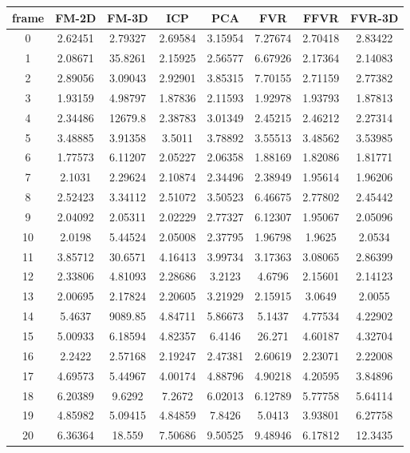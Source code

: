 \begin{figure}
\centering
\begin{tabular}{cccccccc}
\hline
\textbf{frame} & \textbf{FM-2D} & \textbf{FM-3D} & \textbf{ICP} & \textbf{PCA} & \textbf{FVR} & \textbf{FFVR} & \textbf{FVR-3D}
\\ \hline
0 & 2.62451 & 2.79327 & 2.69584 & 3.15954 & 7.27674 & 2.70418 & 2.83422\\
1 & 2.08671 & 35.8261 & 2.15925 & 2.56577 & 6.67926 & 2.17364 & 2.14083\\
2 & 2.89056 & 3.09043 & 2.92901 & 3.85315 & 7.70155 & 2.71159 & 2.77382\\
3 & 1.93159 & 4.98797 & 1.87836 & 2.11593 & 1.92978 & 1.93793 & 1.87813\\
4 & 2.34486 & 12679.8 & 2.38783 & 3.01349 & 2.45215 & 2.46212 & 2.27314\\
5 & 3.48885 & 3.91358 & 3.5011 & 3.78892 & 3.55513 & 3.48562 & 3.53985\\
6 & 1.77573 & 6.11207 & 2.05227 & 2.06358 & 1.88169 & 1.82086 & 1.81771\\
7 & 2.1031 & 2.29624 & 2.10874 & 2.34496 & 2.38949 & 1.95614 & 1.96206\\
8 & 2.52423 & 3.34112 & 2.51072 & 3.50523 & 6.46675 & 2.77802 & 2.45442\\
9 & 2.04092 & 2.05311 & 2.02229 & 2.77327 & 6.12307 & 1.95067 & 2.05096\\
10 & 2.0198 & 5.44524 & 2.05008 & 2.37795 & 1.96798 & 1.9625 & 2.0534\\
11 & 3.85712 & 30.6571 & 4.16413 & 3.99734 & 3.17363 & 3.08065 & 2.86399\\
12 & 2.33806 & 4.81093 & 2.28686 & 3.2123 & 4.6796 & 2.15601 & 2.14123\\
13 & 2.00695 & 2.17824 & 2.20605 & 3.21929 & 2.15915 & 3.0649 & 2.0055\\
14 & 5.4637 & 9089.85 & 4.84711 & 5.86673 & 5.1437 & 4.77534 & 4.22902\\
15 & 5.00933 & 6.18594 & 4.82357 & 6.4146 & 26.271 & 4.60187 & 4.32704\\
16 & 2.2422 & 2.57168 & 2.19247 & 2.47381 & 2.60619 & 2.23071 & 2.22008\\
17 & 4.69573 & 5.44967 & 4.00174 & 4.88796 & 4.90218 & 4.20595 & 3.84896\\
18 & 6.20389 & 9.6292 & 7.2672 & 6.02013 & 6.12789 & 5.77758 & 5.64114\\
19 & 4.85982 & 5.09415 & 4.84859 & 7.8426 & 5.0413 & 3.93801 & 6.27758\\
20 & 6.36364 & 18.559 & 7.50686 & 9.50525 & 9.48946 & 6.17812 & 12.3435\\

\end{tabular}
\end{figure}
